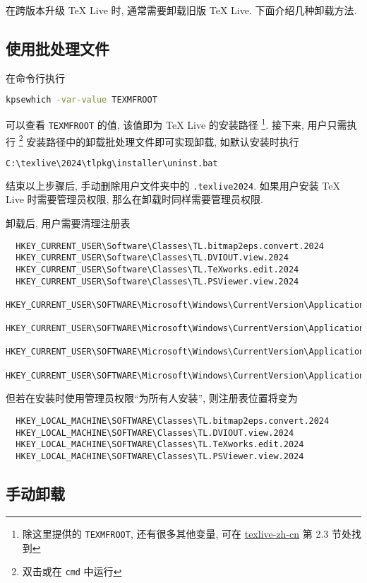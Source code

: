 在跨版本升级 \TeX{} Live 时, 通常需要卸载旧版 \TeX{} Live.
下面介绍几种卸载方法.

\subsection{使用批处理文件}

在命令行执行
\begin{lstlisting}[language=bash]
  kpsewhich -var-value TEXMFROOT
\end{lstlisting}
可以查看 \texttt{TEXMFROOT} 的值,
该值即为 \TeX{} Live 的安装路径%
\footnote{%
  除这里提供的 \texttt{TEXMFROOT}, 还有很多其他变量, 可在
  \href{https://www.tug.org/texlive/doc/texlive-zh-cn/texlive-zh-cn.pdf}{texlive-zh-cn}
  第 2.3 节处找到
}. 
接下来,
用户只需执行%
\footnote{双击或在 \texttt{cmd} 中运行}%
安装路径中的卸载批处理文件即可实现卸载, 如默认安装时执行
\begin{lstlisting}[language=bash]
  C:\texlive\2024\tlpkg\installer\uninst.bat
\end{lstlisting}
结束以上步骤后,
手动删除用户文件夹中的 \texttt{.texlive2024}.
如果用户安装 \TeX{} Live 时需要管理员权限,
那么在卸载时同样需要管理员权限.

卸载后,
用户需要清理注册表
\begin{lstlisting}
  HKEY_CURRENT_USER\Software\Classes\TL.bitmap2eps.convert.2024
  HKEY_CURRENT_USER\Software\Classes\TL.DVIOUT.view.2024
  HKEY_CURRENT_USER\Software\Classes\TL.TeXworks.edit.2024
  HKEY_CURRENT_USER\Software\Classes\TL.PSViewer.view.2024
  HKEY_CURRENT_USER\SOFTWARE\Microsoft\Windows\CurrentVersion\ApplicationAssociationToasts\TL.bitmap2eps.convert.2024_.jpg
  HKEY_CURRENT_USER\SOFTWARE\Microsoft\Windows\CurrentVersion\ApplicationAssociationToasts\TL.bitmap2eps.convert.2024_.png
  HKEY_CURRENT_USER\SOFTWARE\Microsoft\Windows\CurrentVersion\ApplicationAssociationToasts\TL.TeXworks.edit.2024_.sty
  HKEY_CURRENT_USER\SOFTWARE\Microsoft\Windows\CurrentVersion\ApplicationAssociationToasts\TL.TeXworks.edit.2024_.tex
\end{lstlisting}
但若在安装时使用管理员权限``为所有人安装'',
则注册表位置将变为
\begin{lstlisting}
  HKEY_LOCAL_MACHINE\SOFTWARE\Classes\TL.bitmap2eps.convert.2024
  HKEY_LOCAL_MACHINE\SOFTWARE\Classes\TL.DVIOUT.view.2024
  HKEY_LOCAL_MACHINE\SOFTWARE\Classes\TL.TeXworks.edit.2024
  HKEY_LOCAL_MACHINE\SOFTWARE\Classes\TL.PSViewer.view.2024
\end{lstlisting}

\subsection{手动卸载}

